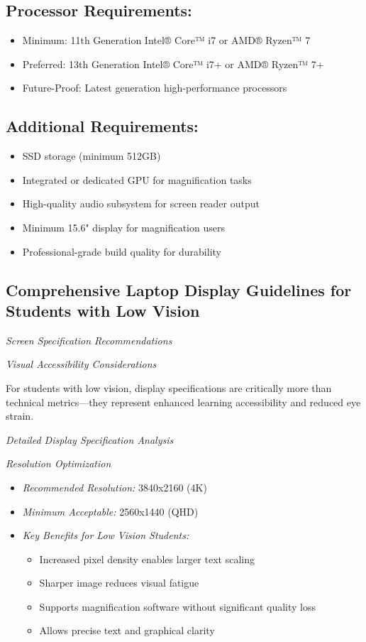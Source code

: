 \subsection{Processor Requirements:}
\begin{itemize}
\item Minimum: 11th Generation Intel® Core™ i7 or AMD® Ryzen™ 7
\item Preferred: 13th Generation Intel® Core™ i7+ or AMD® Ryzen™ 7+
\item Future-Proof: Latest generation high-performance processors
\end{itemize}

\subsection{Additional Requirements:}
\begin{itemize}
\item SSD storage (minimum 512GB)
\item Integrated or dedicated GPU for magnification tasks
\item High-quality audio subsystem for screen reader output
\item Minimum 15.6" display for magnification users
\item Professional-grade build quality for durability
\end{itemize}

\subsection{Comprehensive Laptop Display Guidelines for Students with Low Vision}\label{display-guidelines-low-vision}

\emph{Screen Specification Recommendations}

\textit{Visual Accessibility Considerations}

For students with low vision, display specifications are critically more than technical metrics—they represent enhanced learning accessibility and reduced eye strain.

\emph{Detailed Display Specification Analysis}

\textit{Resolution Optimization}
\begin{itemize}
    \item \emph{Recommended Resolution:} 3840x2160 (4K)
    \item \emph{Minimum Acceptable:} 2560x1440 (QHD)
    \item \emph{Key Benefits for Low Vision Students:}
        \begin{itemize}
            \item Increased pixel density enables larger text scaling
            \item Sharper image reduces visual fatigue
            \item Supports magnification software without significant quality loss
            \item Allows precise text and graphical clarity
        \end{itemize}
\end{itemize}

